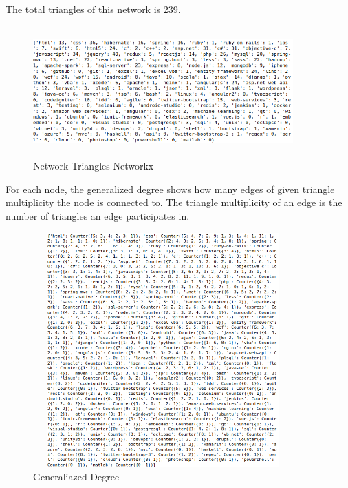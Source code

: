 \documentclass[12pt]{article}
\begin{document}
		The total triangles of this network is 239.
		
		\begin{figure}[ht]
			\centering
			\includegraphics[width=10cm,height=5cm]{triangles}
			\caption{Network Triangles Networkx}
		\end{figure}
		\FloatBarrier
		For each node, the generalized degree shows how many edges of given triangle multiplicity the node is connected to. The triangle multiplicity of an edge is the number of triangles an edge participates in.
		\begin{figure}[ht]
			\centering
			\includegraphics[width=10cm,height=9cm]{generalizeddegree}
			\caption{Generaliazed Degree}
		\end{figure}
		\FloatBarrier
\end{document}
